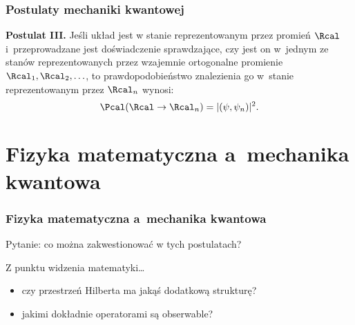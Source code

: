 \documentclass[10pt,t]{beamer}
\begin{document}
\begin{frame}
  \frametitle{Postulaty mechaniki kwantowej}


  \textbf{Postulat III.}
  Jeśli układ jest w stanie reprezentowanym przez promień $\Rcal$
  i~przeprowadzane jest doświadczenie sprawdzające, czy jest on w~jednym ze
  stanów reprezentowanych przez wzajemnie ortogonalne promienie
  $\Rcal_{ 1 }, \Rcal_{ 2 }, \ldots$, to prawdopodobieństwo znalezienia go w~stanie
  reprezentowanym przez $\Rcal_{ n }$ wynosi:
  \begin{equation}
    \label{eq:Matematyczna-strona-02}
    \Pcal( \Rcal \rightarrow \Rcal_{ n }) = | ( \psi, \psi_{ n } ) |^{ 2 }.
  \end{equation}

\end{frame}










\section{Fizyka matematyczna a~mechanika kwantowa}



\begin{frame}
  \frametitle{Fizyka matematyczna a~mechanika kwantowa}


  Pytanie: co można zakwestionować w tych postulatach?


  Z punktu widzenia matematyki\ldots
  \begin{itemize}

  \item czy przestrzeń Hilberta ma jakąś dodatkową strukturę?

  \item jakimi dokładnie operatorami są obserwable?

  \end{itemize}

\end{frame}
\end{document}
